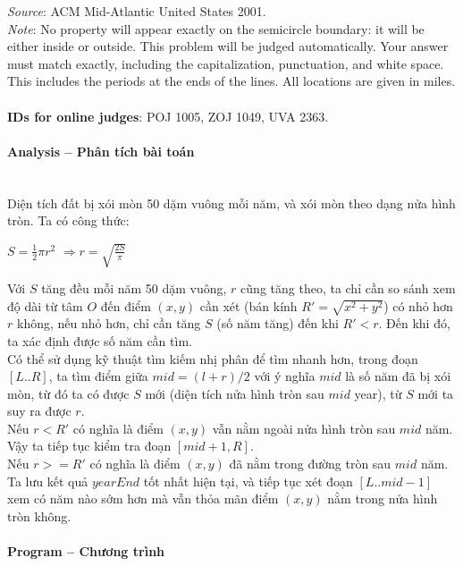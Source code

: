 \documentclass{article}
\begin{document}
\textit{Source}: ACM Mid-Atlantic United States 2001. \\

\textit{Note}: No property will appear exactly on the semicircle boundary: it will be
either inside or outside. This problem will be judged automatically. Your
answer must match exactly, including the capitalization, punctuation,
and white space. This includes the periods at the ends of the lines. All
locations are given in miles.
\\ 
\\
\textbf{IDs for online judges}:  POJ 1005, ZOJ 1049, UVA 2363.


\paragraph{Analysis -- Phân tích bài toán} \mbox{} \\

Diện tích đất bị xói mòn 50 dặm vuông mỗi năm, và xói mòn theo dạng nửa hình tròn. Ta có công thức:\\

\begin{center}
    $S = \frac{1}{2}\pi r^2$
    $\Rightarrow{r = \sqrt{\frac{2S}{\pi}}}$
\end{center}

Với $S$ tăng đều mỗi năm 50 dặm vuông, $r$ cũng tăng theo, ta chỉ cần so sánh xem độ dài từ tâm $O$ đến điểm $(x,y)$ cần xét (bán kính $R' = \sqrt{x^2+y^2}$) có nhỏ hơn $r$ không, nếu nhỏ hơn, chỉ cần tăng $S$ (số năm tăng) đến khi $R' < r$. Đến khi đó, ta xác định được số năm cần tìm. \\ 

Có thể sử dụng kỹ thuật tìm kiếm nhị phân để tìm nhanh hơn, trong đoạn $[L..R]$, ta tìm điểm giữa $mid = (l + r) / 2$ với ý nghĩa $mid$ là số năm đã bị xói mòn, từ đó ta có được $S$ mới (diện tích nửa hình tròn sau $mid$ year), từ $S$ mới ta suy ra được $r$.\\

Nếu $r < R'$ có nghĩa là điểm $(x,y)$ vẫn nằm ngoài nửa hình tròn sau $mid$ năm. Vậy ta tiếp tục kiểm tra đoạn $[mid + 1, R]$. \\
Nếu $r >= R'$ có nghĩa là điểm $(x,y)$ đã nằm trong đường tròn sau $mid$ năm. Ta lưu kết quả $yearEnd$ tốt nhất hiện tại, và tiếp tục xét đoạn $[L..mid-1]$ xem có năm nào sớm hơn mà vẫn thỏa mãn điểm $(x,y)$ nằm trong nửa hình tròn không.

\paragraph{Program -- Chương trình} \mbox{} \\
\end{document}
